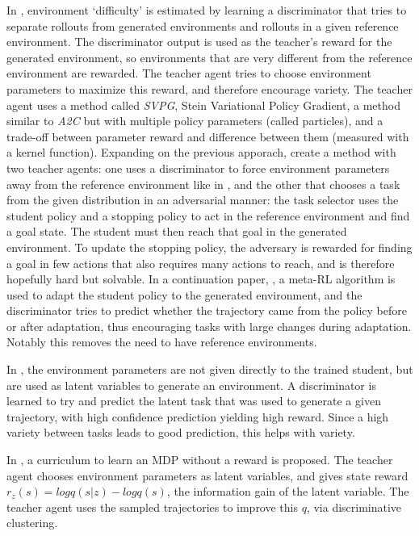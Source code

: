\documentclass[letterpaper]{article}
\theoremstyle{definition}
\begin{document}
In \cite{Mehta2019}, environment `difficulty' is estimated by learning a discriminator that tries to separate rollouts from generated environments and rollouts in a given reference environment. The discriminator output is used as the teacher's reward for the generated environment, so environments that are very different from the reference environment are rewarded. 
The teacher agent tries to choose environment parameters to maximize this reward, and therefore encourage variety. The teacher agent uses a method called \textit{SVPG}, Stein Variational Policy Gradient, a method similar to \textit{A2C} but with multiple policy parameters (called particles), and a trade-off between parameter reward and difference between them (measured with a kernel function).
Expanding on the previous apporach, \cite{Raparthy2020} create a method with two teacher agents: one uses a discriminator to force environment parameters away from the reference environment like in \cite{Mehta2019}, and the other that chooses a task from the given distribution in an adversarial manner: the task selector uses the student policy and a stopping policy to act in the reference environment and find a goal state. The student must then reach that goal in the generated environment. To update the stopping policy, the adversary is rewarded for finding a goal in few actions that also requires many actions to reach, and is therefore hopefully hard but solvable. 
In a continuation paper, \cite{Mehta2020}, a meta-RL algorithm is used to adapt the student policy to the generated environment, and the discriminator tries to predict whether the trajectory came from the policy before or after adaptation, thus encouraging tasks with large changes during adaptation. Notably this removes the need to have reference environments.


In \cite{Gupta2018}, the environment parameters are not given directly to the trained student, but are used as latent variables to generate an environment. A discriminator is learned to try and predict the latent task that was used to generate a given trajectory, with high confidence prediction yielding high reward. Since a high variety between tasks leads to good prediction, this helps with variety.

In \cite{Jabri2019}, a curriculum to learn an MDP without a reward is proposed. The teacher agent chooses environment parameters as latent variables, and gives state reward $r_z(s) = log q(s|z) - log q(s)$, the information gain of the latent variable. The teacher agent uses the sampled trajectories to improve this $q$, via discriminative clustering.
\end{document}
